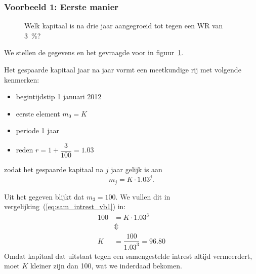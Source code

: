 \subsubsection{Voorbeeld 1: Eerste manier}
\begin{figure}[htbp]
    \centering
{}
    \caption{Welk kapitaal is na drie jaar aangegroeid tot  tegen een WR van \SI{3}{\percent}?}
    \label{fig:oef1verdertellen} 
\end{figure}
We stellen de gegevens en het gevraagde voor in figuur~\ref{fig:oef1verdertellen}.

Het gespaarde kapitaal jaar na jaar vormt een meetkundige rij  met volgende kenmerken:
\begin{itemize}
\item begintijdstip 1 januari 2012
\item eerste element $m_0=K$
\item periode 1 jaar
\item reden $r=1+\dfrac{3}{100}=\num{1.03}$
\end{itemize}
zodat het gespaarde kapitaal na $j$ jaar gelijk is aan 
\begin{equation}
m_j=K\cdot \num{1.03}^j.
\label{eq:sam_intrest_vb1}
\end{equation}

Uit het gegeven blijkt dat $m_3=100$. We vullen dit in vergelijking~(\ref{eq:sam_intrest_vb1}) in:
\begin{align*}
100&=K\cdot \num{1.03}^3\\
&\Updownarrow\\
K&=\dfrac{100}{\num{1.03}^3}=\num{96,80}
\end{align*}
Omdat kapitaal dat uitstaat tegen een samengestelde intrest altijd vermeerdert, moet $K$ kleiner zijn dan 100, wat we inderdaad bekomen.

